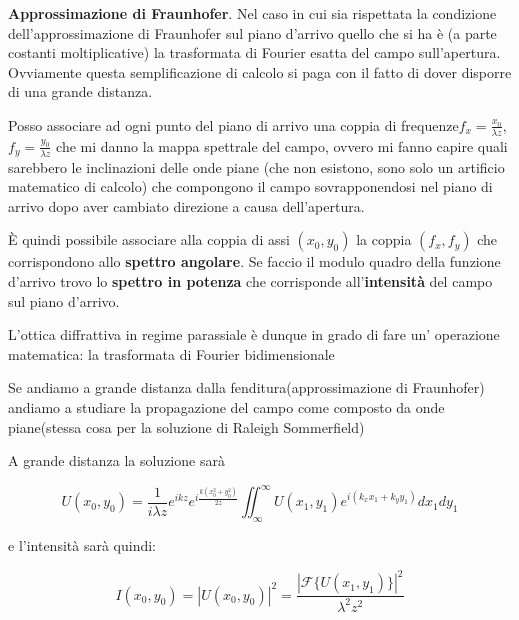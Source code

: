 \documentclass{article}
\begin{document}
\textbf{Approssimazione di Fraunhofer}.
Nel caso in cui sia rispettata la condizione dell'approssimazione di Fraunhofer sul piano d'arrivo quello che si ha è (a parte costanti moltiplicative) la trasformata di Fourier esatta del campo sull'apertura. Ovviamente questa semplificazione di calcolo si paga con il fatto di dover disporre di una grande distanza.

Posso associare ad ogni punto del piano di arrivo una coppia di frequenze$f_{x}=\frac{x_{0}}{\lambda z}$,$f_{y}=\frac{y_{0}}{\lambda z}$ che mi danno la mappa spettrale del campo, ovvero mi fanno capire quali sarebbero le inclinazioni delle onde piane (che non esistono, sono solo un artificio matematico di calcolo) che compongono il campo sovrapponendosi nel piano di arrivo dopo aver cambiato direzione a causa dell'apertura.

È quindi possibile associare alla coppia di assi $(x_{0}, y_{0})$ la coppia $(f_{x}, f_{y})$ che corrispondono allo \textbf{spettro angolare}. Se faccio il modulo quadro della funzione d'arrivo trovo lo \textbf{spettro in potenza} che corrisponde all'\textbf{intensità} del campo sul piano d'arrivo.

L'ottica diffrattiva in regime parassiale è dunque in grado di fare un' operazione matematica: la trasformata di Fourier bidimensionale

Se andiamo a grande distanza dalla fenditura(approssimazione di Fraunhofer) andiamo a studiare la propagazione del campo come composto da onde piane(stessa cosa per la soluzione di Raleigh Sommerfield)

A grande distanza la soluzione sarà

\begin{equation}
U(x_{0}, y_{0})= \frac{1}{i \lambda z} e^{i k z} e^{i \frac{k (x_{0} ^ {2} + y_{0}^{2})}{2 z}}  \iint_{\infty}^{\infty} U(x_{1}, y_{1}) e^{i (k_{x} x_{1} + k_{y} y_{1}) } dx_{1}dy_{1}
\end{equation}

e l'intensità sarà quindi:

\begin{equation}
I(x_{0}, y_{0})=|U(x_{0}, y_{0})|^{2}= \frac{|\mathscr{F} \{ U(x_{1},y_{1})\}|^{2}}{\lambda^{2} z^{2}}
\end{equation}


\end{document}
